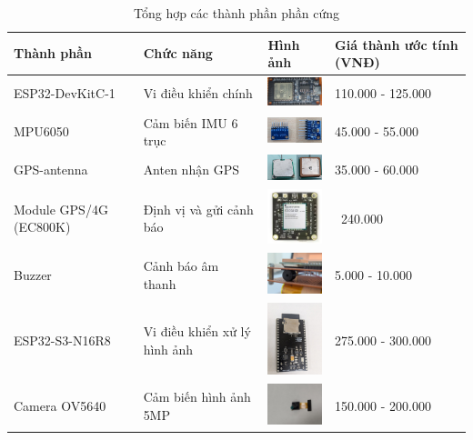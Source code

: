 \begin{table}[H]
    \centering
    \caption{Tổng hợp các thành phần phần cứng}
    \label{tab:hardware_components}
    \begin{tabular}{|l|p{5cm}|p{2cm}|l|}
    \hline
    \textbf{Thành phần} & \textbf{Chức năng} & \textbf{Hình ảnh} & \textbf{Giá thành ước tính (VNĐ)} \\
    \hline
    ESP32-DevKitC-1 & Vi điều khiển chính & \includegraphics[width=2cm]{figures/real_esp32_c1.png} & 110.000 - 125.000 \\
    MPU6050 & Cảm biến IMU 6 trục & \includegraphics[width=2cm]{figures/real_mpu6050.png} & 45.000 - 55.000 \\
    GPS-antenna & Anten nhận GPS & \includegraphics[width=2cm]{figures/real_gps_antenna.png} & 35.000 - 60.000 \\
    Module GPS/4G (EC800K) & Định vị và gửi cảnh báo & \includegraphics[width=2cm]{figures/real_ec800k.jpg} & ~240.000 \\
    Buzzer & Cảnh báo âm thanh & \includegraphics[width=2cm]{figures/real_buzzer.jpg} & 5.000 - 10.000 \\
    ESP32-S3-N16R8 & Vi điều khiển xử lý hình ảnh & \includegraphics[width=2cm]{figures/real_esp32_s3_2.jpg} & 275.000 - 300.000 \\
    Camera OV5640 & Cảm biến hình ảnh 5MP & \includegraphics[width=2cm]{figures/real_ov5640.jpg} & 150.000 - 200.000 \\
    \hline
    \end{tabular}
\end{table}
